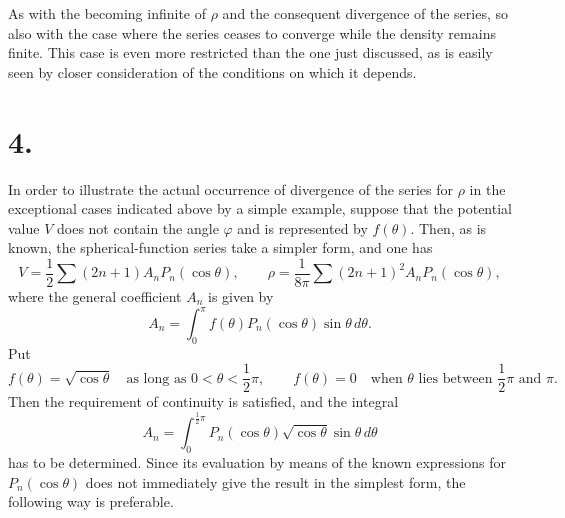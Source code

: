 \documentclass[11pt]{article}
\newcommand{\dd}{\,d}
\begin{document}
As with the becoming infinite of $\rho$ and the consequent divergence of the series, so also with the case where the series ceases to converge while the density remains finite. This case is even more restricted than the one just discussed, as is easily seen by closer consideration of the conditions on which it depends.

\section*{4.}

In order to illustrate the actual occurrence of divergence of the series for $\rho$ in the exceptional cases indicated above by a simple example, suppose that the potential value $V$ does not contain the angle $\varphi$ and is represented by $f(\theta)$. Then, as is known, the spherical-function series take a simpler form, and one has
\[
 V=\frac12\sum(2n+1)A_nP_n(\cos\theta),
\qquad
 \rho=\frac1{8\pi}\sum(2n+1)^2A_nP_n(\cos\theta),
\]
where the general coefficient $A_n$ is given by
\[
 A_n=\int_0^\pi f(\theta)P_n(\cos\theta)\sin\theta\dd\theta.
\]
Put
\[
 f(\theta)=\sqrt{\cos\theta}\quad\text{as long as }0<\theta<\frac12\pi,
\qquad
 f(\theta)=0\quad\text{when }\theta\text{ lies between }\frac12\pi\text{ and }\pi.
\]
Then the requirement of continuity is satisfied, and the integral
\[
 A_n=\int_0^{\frac12\pi}P_n(\cos\theta)\sqrt{\cos\theta}\sin\theta\dd\theta
\]
has to be determined. Since its evaluation by means of the known expressions for $P_n(\cos\theta)$ does not immediately give the result in the simplest form, the following way is preferable.
\end{document}
